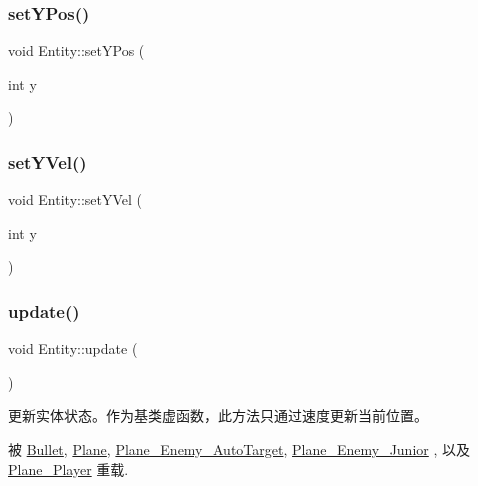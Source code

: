 \mbox{\label{class_entity_a66278a362d97e2a30912c2a31962bfb9}} 
\subsubsection{\texorpdfstring{set\+Y\+Pos()}{setYPos()}}
{\footnotesize\ttfamily void Entity\+::set\+Y\+Pos (\begin{DoxyParamCaption}\item[{int}]{y }\end{DoxyParamCaption})\hspace{0.3cm}{\ttfamily [inline]}}

\mbox{\label{class_entity_a9d7c4a35217e6f83ac21da314aa3ec9a}} 
\subsubsection{\texorpdfstring{set\+Y\+Vel()}{setYVel()}}
{\footnotesize\ttfamily void Entity\+::set\+Y\+Vel (\begin{DoxyParamCaption}\item[{int}]{y }\end{DoxyParamCaption})\hspace{0.3cm}{\ttfamily [inline]}}

\mbox{\label{class_entity_a00b6eeaf99b35c8f8b10b5fbfc1baf4f}} 
\subsubsection{\texorpdfstring{update()}{update()}}
{\footnotesize\ttfamily void Entity\+::update (\begin{DoxyParamCaption}{ }\end{DoxyParamCaption})\hspace{0.3cm}{\ttfamily [virtual]}}



更新实体状态。作为基类虚函数，此方法只通过速度更新当前位置。 



被 \hyperlink{class_bullet_a32f4a0611fe2dd245fee955d14ca1f68}{Bullet}, \hyperlink{class_plane_a7fbb07f76503fe057772e01f542afc32}{Plane}, \hyperlink{class_plane___enemy___auto_target_acae2a6f38bdc71d17188e2b7711f4d5b}{Plane\+\_\+\+Enemy\+\_\+\+Auto\+Target}, \hyperlink{class_plane___enemy___junior_a686e46c9927793dd07235cac72d52405}{Plane\+\_\+\+Enemy\+\_\+\+Junior} , 以及 \hyperlink{class_plane___player_ae68c08ce11fad9fd164c00eb4db6b348}{Plane\+\_\+\+Player} 重载.



